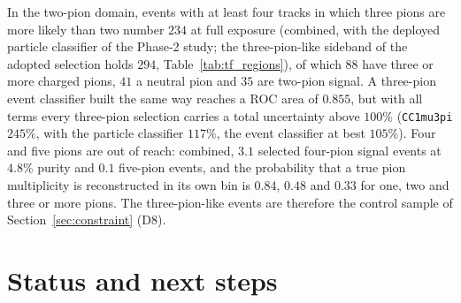 \documentclass[11pt,a4paper]{article}
\begin{document}
In the two-pion domain, events with at least four tracks in which three pions are more likely than two
number $234$ at full exposure (combined, with the deployed particle classifier of the Phase-2 study; the
three-pion-like sideband of the adopted selection holds $294$, Table~\ref{tab:tf_regions}), of which $88$ have three or more charged pions, $41$ a neutral
pion and $35$ are two-pion signal. A three-pion event classifier built the same way reaches a ROC area of
$0.855$, but with all terms every three-pion selection carries a total uncertainty above $100\%$
(\texttt{CC1mu3pi} $245\%$, with the particle classifier $117\%$, the event classifier at best
$105\%$). Four and five pions are out of reach: combined, $3.1$ selected four-pion signal events at
$4.8\%$ purity and $0.1$ five-pion events, and the probability that a true pion multiplicity is
reconstructed in its own bin is $0.84$, $0.48$ and $0.33$ for one, two and three or more pions. The
three-pion-like events are therefore the control sample of Section~\ref{sec:constraint} (D8).

\section{Status and next steps}
\label{sec:status}
\end{document}
